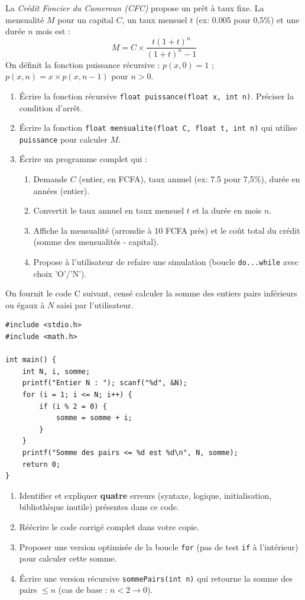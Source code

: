 \documentclass[11pt]{article}
\begin{document}
\begin{exercice}
La \textit{Crédit Foncier du Cameroun (CFC)} propose un prêt à taux fixe. La mensualité $M$ pour un capital $C$, un taux mensuel $t$ (ex: 0.005 pour 0,5\%) et une durée $n$ mois est :
$$M = C \times \frac{t(1+t)^n}{(1+t)^n - 1}$$
On définit la fonction puissance récursive : $p(x, 0) = 1$ ; $p(x, n) = x \times p(x, n-1)$ pour $n > 0$.

\begin{enumerate}
    \item Écrire la fonction récursive \texttt{float puissance(float x, int n)}. Préciser la condition d'arrêt.
    \item Écrire la fonction \texttt{float mensualite(float C, float t, int n)} qui utilise \texttt{puissance} pour calculer $M$.
    \item Écrire un programme complet qui :
    \begin{enumerate}
        \item Demande $C$ (entier, en FCFA), taux annuel (ex: 7.5 pour 7,5\%), durée en années (entier).
        \item Convertit le taux annuel en taux mensuel $t$ et la durée en mois $n$.
        \item Affiche la mensualité (arrondie à 10 FCFA près) et le coût total du crédit (somme des mensualités - capital).
        \item Propose à l'utilisateur de refaire une simulation (boucle \texttt{do...while} avec choix 'O'/'N').
    \end{enumerate}
\end{enumerate}
\end{exercice}

\begin{exercice}
On fournit le code C suivant, censé calculer la somme des entiers pairs inférieurs ou égaux à $N$ saisi par l'utilisateur.

\begin{verbatim}
#include <stdio.h>
#include <math.h>

int main() {
    int N, i, somme;
    printf("Entier N : "); scanf("%d", &N);
    for (i = 1; i <= N; i++) {
        if (i % 2 = 0) {
            somme = somme + i;
        }
    }
    printf("Somme des pairs <= %d est %d\n", N, somme);
    return 0;
}
\end{verbatim}

\begin{enumerate}
    \item Identifier et expliquer \textbf{quatre} erreurs (syntaxe, logique, initialisation, bibliothèque inutile) présentes dans ce code.
    \item Réécrire le code corrigé complet dans votre copie.
    \item Proposer une version optimisée de la boucle \texttt{for} (pas de test \texttt{if} à l'intérieur) pour calculer cette somme.
    \item Écrire une version récursive \texttt{sommePairs(int n)} qui retourne la somme des pairs $\le n$ (cas de base : $n < 2 \rightarrow 0$).
\end{enumerate}
\end{exercice}
\end{document}

